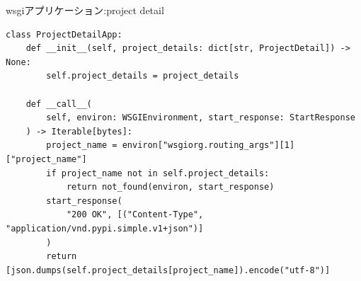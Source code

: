 \documentclass[presentation]{beamer}
\begin{document}
\begin{frame}[label={sec:orgdc14128},fragile]{wsgiアプリケーション:project detail}
 \begin{verbatim}
class ProjectDetailApp:
    def __init__(self, project_details: dict[str, ProjectDetail]) -> None:
        self.project_details = project_details

    def __call__(
        self, environ: WSGIEnvironment, start_response: StartResponse
    ) -> Iterable[bytes]:
        project_name = environ["wsgiorg.routing_args"][1]["project_name"]
        if project_name not in self.project_details:
            return not_found(environ, start_response)
        start_response(
            "200 OK", [("Content-Type", "application/vnd.pypi.simple.v1+json")]
        )
        return [json.dumps(self.project_details[project_name]).encode("utf-8")]

\end{verbatim}
\end{frame}
\end{document}
